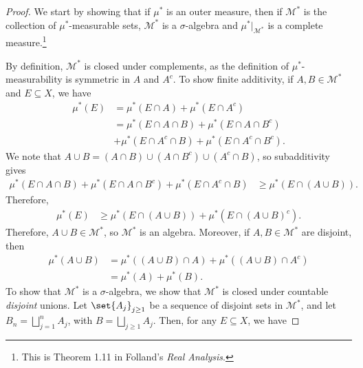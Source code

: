 \documentclass[10pt]{mypackage}
\begin{document}
\begin{proof}
  We start by showing that if $\mu^{\ast}$ is an outer measure, then if $\mathcal{M}^{\ast}$ is the collection of $\mu^{\ast}$-measurable sets, $\mathcal{M}^{\ast}$ is a $\sigma$-algebra and $\mu^{\ast}|_{\mathcal{M}^{\ast}}$ is a complete measure.\footnote{This is Theorem 1.11 in Folland's \textit{Real Analysis}.}\newline

  By definition, $\mathcal{M}^{\ast}$ is closed under complements, as the definition of $\mu^{\ast}$-measurability is symmetric in $A$ and $A^{c}$. To show finite additivity, if $A,B\in \mathcal{M}^{\ast}$ and $E\subseteq X$, we have
  \begin{align*}
    \mu^{\ast}\left( E \right) &= \mu^{\ast}\left( E\cap A \right) + \mu^{\ast}\left( E\cap A^{c} \right)\\
                               &= \mu^{\ast}\left( E\cap A\cap B \right) + \mu^{\ast}\left( E\cap A \cap B^{c} \right)\\
                               &+ \mu^{\ast}\left( E\cap A^{c}\cap B \right) + \mu^{\ast}\left( E\cap A^{c}\cap B^{c} \right).
  \end{align*}
  We note that $A\cup B = \left( A\cap B \right) \cup \left( A\cap B^{c} \right)\cup \left( A^{c}\cap B \right)$, so subadditivity gives
  \begin{align*}
    \mu^{\ast}\left( E\cap A\cap B \right) + \mu^{\ast}\left( E\cap A \cap B^{c} \right) + \mu^{\ast}\left( E\cap A^{c}\cap B \right) &\geq \mu^{\ast}\left( E\cap \left( A\cup B \right) \right).
  \end{align*}
  Therefore,
  \begin{align*}
    \mu^{\ast}\left( E \right) &\geq \mu^{\ast}\left( E\cap \left( A\cup B \right) \right) + \mu^{\ast}\left( E\cap \left( A\cup B \right)^{c} \right).
  \end{align*}
  Therefore, $A\cup B\in \mathcal{M}^{\ast}$, so $\mathcal{M}^{\ast}$ is an algebra. Moreover, if $A,B\in \mathcal{M}^{\ast}$ are disjoint, then
  \begin{align*}
    \mu^{\ast}\left( A\cup B \right) &= \mu^{\ast}\left( \left( A\cup B \right)\cap A \right) + \mu^{\ast}\left( \left( A\cup B \right)\cap A^{c} \right)\\
                                     &= \mu^{\ast}\left( A \right) + \mu^{\ast}\left( B \right).
  \end{align*}
  To show that $\mathcal{M}^{\ast}$ is a $\sigma$-algebra, we show that $\mathcal{M}^{\ast}$ is closed under countable \textit{disjoint} unions. Let $\set{A_j}_{j\geq 1}$ be a sequence of disjoint sets in $\mathcal{M}^{\ast}$, and let $B_n = \bigsqcup_{j = 1}^{n} A_j$, with $B = \bigsqcup_{j\geq 1}A_j$. Then, for any $E\subseteq X$, we have

\end{proof}
\end{document}
